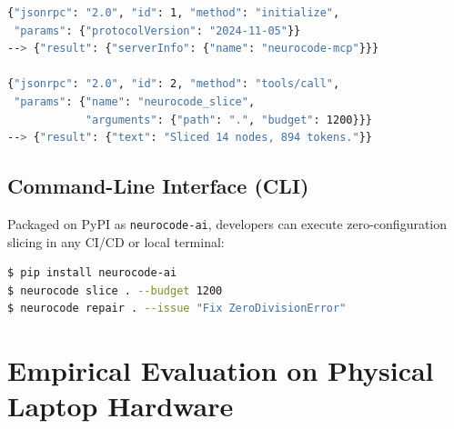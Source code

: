 \documentclass[10pt, conference]{IEEEtran}
\begin{document}
\begin{lstlisting}[language=bash,caption={Stdio MCP JSON-RPC 2.0 Tool Protocol.},label={lst:mcp}]
{"jsonrpc": "2.0", "id": 1, "method": "initialize",
 "params": {"protocolVersion": "2024-11-05"}}
--> {"result": {"serverInfo": {"name": "neurocode-mcp"}}}

{"jsonrpc": "2.0", "id": 2, "method": "tools/call",
 "params": {"name": "neurocode_slice",
            "arguments": {"path": ".", "budget": 1200}}}
--> {"result": {"text": "Sliced 14 nodes, 894 tokens."}}
\end{lstlisting}

\subsection{Command-Line Interface (CLI)}
Packaged on PyPI as \texttt{neurocode-ai}, developers can execute zero-configuration slicing in any CI/CD or local terminal:
\begin{lstlisting}[language=bash]
$ pip install neurocode-ai
$ neurocode slice . --budget 1200
$ neurocode repair . --issue "Fix ZeroDivisionError"
\end{lstlisting}

\section{Empirical Evaluation on Physical Laptop Hardware}

\begin{table}[t]
\centering
\caption{SWE-bench Lite Performance on Physical RTX 3050 Laptop GPU (3.67\,GB VRAM)}
\label{tab:results}
\end{table}
\end{document}
